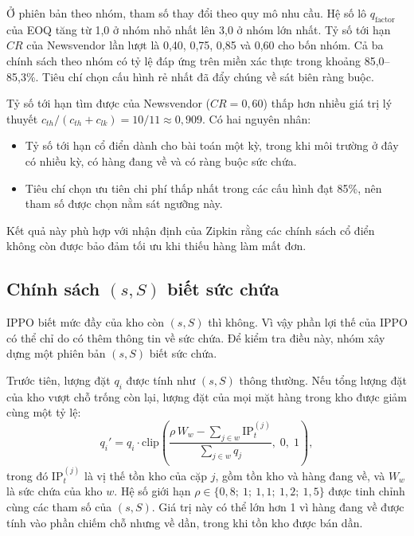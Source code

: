 Ở phiên bản theo nhóm, tham số thay đổi theo quy mô nhu cầu. Hệ số lô $q_{\text{factor}}$ của EOQ tăng từ 1,0 ở nhóm nhỏ nhất lên 3,0 ở nhóm lớn nhất. Tỷ số tới hạn $CR$ của Newsvendor lần lượt là 0,40, 0,75, 0,85 và 0,60 cho bốn nhóm. Cả ba chính sách theo nhóm có tỷ lệ đáp ứng trên miền xác thực trong khoảng 85,0--85,3\%. Tiêu chí chọn cấu hình rẻ nhất đã đẩy chúng về sát biên ràng buộc.

Tỷ số tới hạn tìm được của Newsvendor ($CR = 0{,}60$) thấp hơn nhiều giá trị lý thuyết $c_{th}/(c_{th} + c_{lk}) = 10/11 \approx 0{,}909$. Có hai nguyên nhân:
\begin{itemize}
    \item Tỷ số tới hạn cổ điển dành cho bài toán một kỳ, trong khi môi trường ở đây có nhiều kỳ, có hàng đang về và có ràng buộc sức chứa.
    \item Tiêu chí chọn ưu tiên chi phí thấp nhất trong các cấu hình đạt 85\%, nên tham số được chọn nằm sát ngưỡng này.
\end{itemize}

Kết quả này phù hợp với nhận định của Zipkin \cite{zipkin2008} rằng các chính sách cổ điển không còn được bảo đảm tối ưu khi thiếu hàng làm mất đơn.

\subsection{Chính sách \texorpdfstring{$(s, S)$}{(s, S)} biết sức chứa}
\label{subsec:baselineSucChua}

IPPO biết mức đầy của kho còn $(s, S)$ thì không. Vì vậy phần lợi thế của IPPO có thể chỉ do có thêm thông tin về sức chứa. Để kiểm tra điều này, nhóm xây dựng một phiên bản $(s, S)$ biết sức chứa.

Trước tiên, lượng đặt $q_i$ được tính như $(s, S)$ thông thường. Nếu tổng lượng đặt của kho vượt chỗ trống còn lại, lượng đặt của mọi mặt hàng trong kho được giảm cùng một tỷ lệ:
\begin{equation}
    q_i' = q_i \cdot \mathrm{clip}\!\left(
    \frac{\rho\, W_w - \sum_{j \in w} \text{IP}_t^{(j)}}{\sum_{j \in w} q_j},\; 0,\; 1\right),
    \label{eq:ssSucChua}
\end{equation}
trong đó $\text{IP}_t^{(j)}$ là vị thế tồn kho của cặp $j$, gồm tồn kho và hàng đang về, và $W_w$ là sức chứa của kho $w$. Hệ số giới hạn $\rho \in \{0{,}8;\ 1;\ 1{,}1;\ 1{,}2;\ 1{,}5\}$ được tinh chỉnh cùng các tham số của $(s, S)$. Giá trị này có thể lớn hơn 1 vì hàng đang về được tính vào phần chiếm chỗ nhưng về dần, trong khi tồn kho được bán dần.

